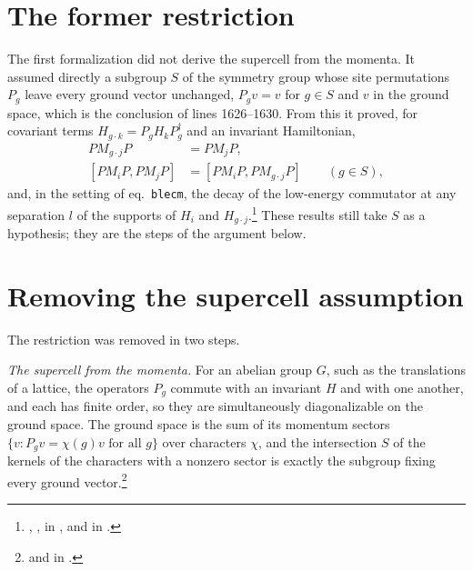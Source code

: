 \documentclass{article}
\begin{document}
\section{The former restriction}
The first formalization did not derive the supercell from the momenta. It
assumed directly a subgroup $S$ of the symmetry group whose site permutations
$P_g$ leave every ground vector unchanged, $P_gv=v$ for $g\in S$ and $v$ in
the ground space, which is the conclusion of lines 1626--1630. From this it
proved, for covariant terms $H_{g\cdot k}=P_gH_kP_g^\dagger$ and an invariant
Hamiltonian,
\begin{align}
    PM_{g\cdot j}P & =PM_jP,
    \label{eq:hastings05_translation_supercell_compression} \\
    [PM_iP,PM_jP]  & =[PM_iP,PM_{g\cdot j}P]\qquad(g\in S),
    \label{eq:hastings05_translation_supercell_commutator}
\end{align}
and, in the setting of eq.~\texttt{blecm}, the decay of the low-energy
commutator at any separation $l$ of the supports of $H_i$ and
$H_{g\cdot j}$.\footnote{,
    ,
    in , and
    in .}
These results still take $S$ as a hypothesis; they are the steps of the
argument below.

\section{Removing the supercell assumption}
The restriction was removed in two steps.

\emph{The supercell from the momenta.} For an abelian group $G$, such as the
translations of a lattice, the operators $P_g$ commute with an invariant $H$
and with one another, and each has finite order, so they are simultaneously
diagonalizable on the ground space. The ground space is the sum of its
momentum sectors $\{v:P_gv=\chi(g)v\text{ for all }g\}$ over characters
$\chi$, and the intersection $S$ of the kernels of the characters with a
nonzero sector is exactly the subgroup fixing every ground
vector.\footnote{ and
     in
    .}
\end{document}
